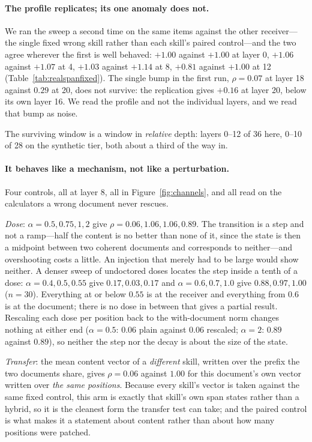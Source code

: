 \documentclass{article}
\begin{document}
\paragraph{The profile replicates; its one anomaly does not.} We ran the sweep a
second time on the same items against the other receiver---the single fixed
wrong skill rather than each skill's paired control---and the two agree wherever
the first is well behaved: $+1.00$ against $+1.00$ at layer 0, $+1.06$ against
$+1.07$ at 4, $+1.03$ against $+1.14$ at 8, $+0.81$ against $+1.00$ at 12
(Table~\ref{tab:realspanfixed}). The single bump in the first run, $\rho=0.07$
at layer 18 against $0.29$ at 20, does not survive: the replication gives $+0.16$
at layer 20, below its own layer 16. We read the profile and not the individual
layers, and we read that bump as noise.



The surviving window is a window in \emph{relative} depth: layers 0--12 of 36
here, 0--10 of 28 on the synthetic tier, both about a third of the way in.



\paragraph{It behaves like a mechanism, not like a perturbation.} Four
controls, all at layer $8$, all in Figure~\ref{fig:channels}, and all read on
the calculators a wrong document never rescues.

\emph{Dose}: $\alpha = 0.5, 0.75, 1, 2$ give $\rho = 0.06, 1.06, 1.06, 0.89$.
The transition is a step and not a ramp---half the content is no better than
none of it, since the state is then a midpoint between two coherent documents and
corresponds to neither---and overshooting costs a little. An injection that
merely had to be large would show neither. A denser sweep of undoctored doses
locates the step inside a tenth of a dose: $\alpha = 0.4, 0.5, 0.55$ give
$0.17, 0.03, 0.17$ and $\alpha = 0.6, 0.7, 1.0$ give $0.88, 0.97, 1.00$
($n=30$). Everything at or below $0.55$ is at the receiver and everything from
$0.6$ is at the document; there is no dose in between that gives a partial
result. Rescaling each dose per position back
to the with-document norm changes nothing at either end ($\alpha = 0.5$: $0.06$
plain against $0.06$ rescaled; $\alpha = 2$: $0.89$ against $0.89$), so neither
the step nor the decay is about the size of the state.

\emph{Transfer}: the mean content vector of a \emph{different} skill, written
over the prefix the two documents share, gives $\rho = 0.06$ against $1.00$ for
this document's own vector written over \emph{the same positions}. Because every
skill's vector is taken against the same fixed control, this arm is exactly that
skill's own span states rather than a hybrid, so it is the cleanest form the
transfer test can take; and the paired control is what makes it a statement about
content rather than about how many positions were patched.
\end{document}

